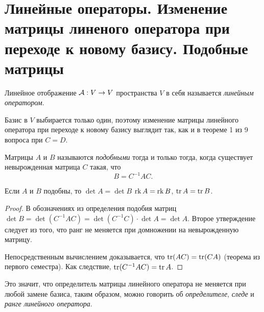 \section{Линейные операторы. Изменение матрицы линеного оператора при переходе к новому базису. Подобные матрицы}

\begin{definition}
    Линейное отображение $\mathcal{A}: V \to V$ пространства $V$ в себя называется \textit{линейным оператором}.
\end{definition}

Базис в $V$ выбирается только один, поэтому изменение матрицы линейного оператора при переходе к новому базису выглядит так, как и в теореме 1 из 9 вопроса при $C = D$.

\begin{definition}
    Матрицы $A$ и $B$ называются \textit{подобными} тогда и только тогда, когда существует невырожденная матрица $C$ такая, что
    \[
        B = C^{-1}AC.
    \]
\end{definition}

\begin{proposal}
    Если $A$ и $B$ подобны, то $\det A = \det B$ $\operatorname{rk} A = \operatorname{rk} B$, $\operatorname{tr} A = \operatorname{tr} B$.
\end{proposal}

\begin{proof}
    В обозначениях из определения подобия матриц $\det B = \det(C^{-1}AC) = \det(C^{-1}C) \cdot \det A = \det A$. Второе утверждение следует из того, что ранг не меняется при домножении на невырожденную матрицу.

    Непосредственным вычислением доказывается, что $\operatorname{tr}(AC) = \operatorname{tr}(CA)$ (теорема из первого семестра). Как следствие, $\operatorname{tr}(C^{-1}AC) = \operatorname{tr} A$.
\end{proof}

Это значит, что определитель матрицы линейного оператора не меняется при любой замене базиса, таким образом, можно говорить об \textit{определителе}, \textit{следе} и \textit{ранге линейного оператора}.

